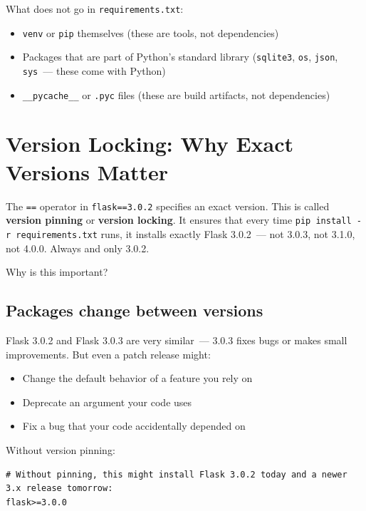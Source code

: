 \noindent{}What does not go in \texttt{requirements.txt}:

\begin{itemize}
\tightlist
\item
  \texttt{venv} or \texttt{pip} themselves (these are tools, not dependencies)
\item
  Packages that are part of Python's standard library (\texttt{sqlite3}, \texttt{os}, \texttt{json}, \texttt{sys}~--- these come with Python)
\item
  \texttt{\_\_pycache\_\_} or \texttt{.pyc} files (these are build artifacts, not dependencies)
\end{itemize}

\setcounter{section}{1}
\section{Version Locking: Why Exact Versions Matter}\label{12-dependency-declaration:122-version-locking-why-exact-versions-matter}

The \texttt{==} operator in \texttt{flask==3.0.2} specifies an exact version. This is called \textbf{version pinning} or \textbf{version locking}. It ensures that every time \texttt{pip\ install\ -}\allowbreak{}\texttt{r\ requirements.}\allowbreak{}\texttt{txt} runs, it installs exactly Flask 3.0.2~--- not 3.0.3, not 3.1.0, not 4.0.0. Always and only 3.0.2.

Why is this important?

\subsection*{Packages change between versions}\label{12-dependency-declaration:packages-change-between-versions}

Flask 3.0.2 and Flask 3.0.3 are very similar~--- 3.0.3 fixes bugs or makes small improvements. But even a patch release might:

\begin{itemize}
\tightlist
\item
  Change the default behavior of a feature you rely on
\item
  Deprecate an argument your code uses
\item
  Fix a bug that your code accidentally depended on
\end{itemize}

\noindent{}Without version pinning:

\begin{outputbox}[short]
\begin{Verbatim}[fontsize=\codesize, breaklines, breakanywhere, breaksymbolleft={\tiny\textcolor{muted}{$\hookrightarrow$}}]
# Without pinning, this might install Flask 3.0.2 today and a newer 3.x release tomorrow:
flask>=3.0.0
\end{Verbatim}
\end{outputbox}

